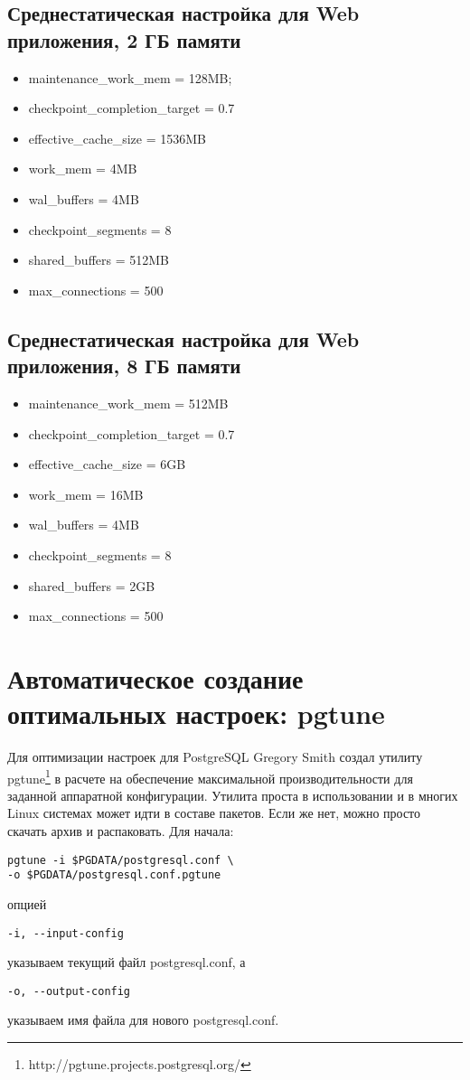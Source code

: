 \subsection{Среднестатическая настройка для Web приложения, 2 ГБ памяти}

\begin{itemize}
\item maintenance\_work\_mem = 128MB;
\item checkpoint\_completion\_target = 0.7
\item effective\_cache\_size = 1536MB
\item work\_mem = 4MB
\item wal\_buffers = 4MB
\item checkpoint\_segments = 8
\item shared\_buffers = 512MB
\item max\_connections = 500
\end{itemize}

\subsection{Среднестатическая настройка для Web приложения, 8 ГБ памяти}

\begin{itemize}
\item maintenance\_work\_mem = 512MB
\item checkpoint\_completion\_target = 0.7
\item effective\_cache\_size = 6GB
\item work\_mem = 16MB
\item wal\_buffers = 4MB
\item checkpoint\_segments = 8
\item shared\_buffers = 2GB
\item max\_connections = 500
\end{itemize}

\section{Автоматическое создание оптимальных настроек: pgtune}

Для оптимизации настроек для PostgreSQL Gregory Smith создал утилиту pgtune\footnote{http://pgtune.projects.postgresql.org/} 
в расчете на обеспечение максимальной производительности для заданной аппаратной конфигурации.
Утилита проста в использовании и в многих Linux системах может идти в составе пакетов. 
Если же нет, можно просто скачать архив и распаковать.
Для начала:
\begin{verbatim}
pgtune -i $PGDATA/postgresql.conf \
-o $PGDATA/postgresql.conf.pgtune
\end{verbatim}
опцией 
\begin{verbatim}-i, --input-config\end{verbatim} 
указываем текущий файл postgresql.conf, 
а 
\begin{verbatim}-o, --output-config\end{verbatim}
указываем имя файла для нового postgresql.conf.

